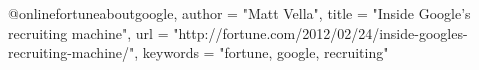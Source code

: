 @online{fortuneaboutgoogle,
    author    = "Matt Vella",
    title     = "Inside Google's recruiting machine",
    url       = "http://fortune.com/2012/02/24/inside-googles-recruiting-machine/",
    keywords  = "fortune, google, recruiting"
}